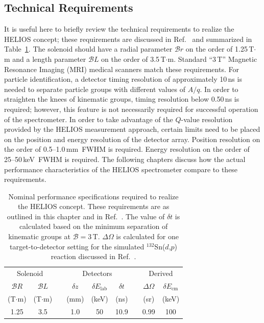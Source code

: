 \subsection{Technical Requirements}
It is useful here to briefly review the technical requirements to realize the HELIOS concept; these requirements are discussed in Ref.~\cite{Wuosmaa_2007} and summarized in Table~\ref{helios_req}.  The solenoid should have a radial parameter $\mathscr{B}r$ on the order of 1.25\,T$\cdot$m and a length parameter $\mathscr{B}L$ on the order of 3.5\,T$\cdot$m.  Standard ``3\,T'' Magnetic Resonance Imaging (MRI) medical scanners match these requirements.  For particle identification, a detector timing resolution of approximately 10\,ns is needed to separate particle groups with different values of $A/q$.  In order to straighten the knees of kinematic groups, timing resolution below 0.50\,ns is required; however, this feature is not necessarily required for successful operation of the spectrometer.  In order to take advantage of the $Q$-value resolution provided by the HELIOS measurement approach, certain limits need to be placed on the position and energy resolution of the detector array.  Position resolution on the order of 0.5--1.0\,mm~FWHM is required.  Energy resolution on the order of 25--50\,keV~FWHM is required.  The following chapters discuss how the actual performance characteristics of the HELIOS spectrometer compare to these requirements.

\begin{table}[b]
\centering
\begin{tabular}{ccccccccc}
\hline
\multicolumn{2}{c}{Solenoid}  &  &
\multicolumn{3}{c}{Detectors}  & & 
\multicolumn{2}{c}{Derived}\\ \cline{1-2} \cline{4-6} \cline{8-9}
\multicolumn{1}{c}{$\mathscr{B}R$}  &  
\multicolumn{1}{c}{$\mathscr{B}L$}  & &
\multicolumn{1}{c}{$\delta z$}  &  
\multicolumn{1}{c}{$\delta E_\textrm{lab}$} &
\multicolumn{1}{c}{$\delta t$} &&
\multicolumn{1}{c}{$\Delta \Omega$}  &  
\multicolumn{1}{c}{$\delta E_\mathrm{cm}$}  \\
(T$\cdot$m)&(T$\cdot$m)&&(mm)&(keV)&(ns)&&(sr)&(keV)\\
\hline \hline
1.25&3.5&&1.0&50&10.9&&0.99&100
\\
\hline 
\end{tabular}
\caption[Nominal performance specifications required to realize the HELIOS concept]{Nominal performance specifications required to realize the HELIOS concept.  These requirements are as outlined in this chapter and in Ref.~\cite{Wuosmaa_2007}.  The value of $\delta t$ is calculated based on the minimum separation of kinematic groups at $\mathscr{B}=3$\,T.  $\Delta \Omega$ is calculated for one target-to-detector setting for the simulated $^{132}$Sn($d$,$p$) reaction discussed in Ref.~\cite{Wuosmaa_2007}.}
\label{helios_req}
\end{table}
